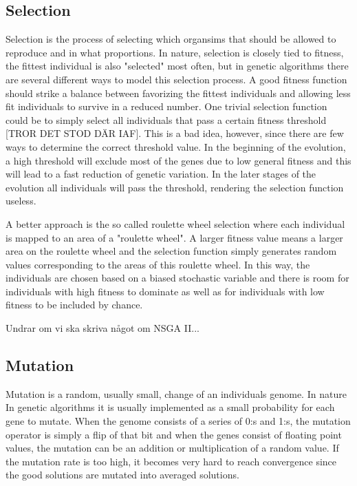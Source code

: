 \documentclass[a4paper,11pt]{kth-mag}
\begin{document}
\subsection{Selection}
Selection is the process of selecting which organsims that should be allowed to reproduce and in what proportions. In nature, selection is closely tied to fitness, the fittest individual is also "selected" most often, but in genetic algorithms there are several different ways to model this selection process. A good fitness function should strike a balance between favorizing the fittest individuals and allowing less fit individuals to survive in a reduced number.  One trivial selection function could be to simply select all individuals that pass a certain fitness threshold \cite{marsland} [TROR DET STOD DÄR IAF]. This is a bad idea, however, since there are few ways to determine the correct threshold value. In the beginning of the evolution, a high threshold will exclude most of the genes due to low general fitness and this will lead to a fast reduction of genetic variation. In the later stages of the evolution all individuals will pass the threshold, rendering the selection function useless.

A better approach is the so called roulette wheel selection where each individual is mapped to an area of a "roulette wheel". A larger fitness value means a larger area on the roulette wheel and the selection function simply generates random values corresponding to the areas of this roulette wheel. In this way, the individuals are chosen based on a biased stochastic variable and there is room for individuals with high fitness to dominate as well as for individuals with low fitness to be included by chance.

Undrar om vi ska skriva något om NSGA II...
 
\subsection{Mutation}
Mutation is a random, usually small, change of an individuals genome. In nature In genetic algorithms it is usually implemented as a small probability for each gene to mutate. When the genome consists of a series of 0:s and 1:s, the mutation operator is simply a flip of that bit and when the genes consist of floating point values, the mutation can be an addition or multiplication of a random value. If the mutation rate is too high, it becomes very hard to reach convergence since the good solutions are mutated into averaged solutions.
\end{document}

